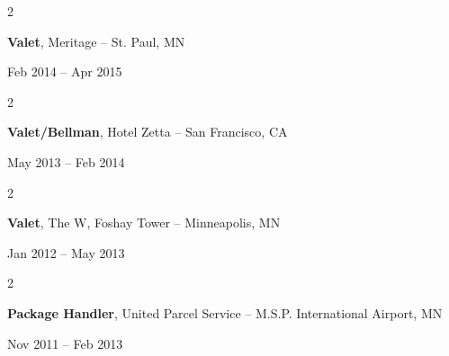 \documentclass[10pt, letterpaper]{article}
\newenvironment{twocolentry}[2][]{
    \onecolentry
    \def\secondColumn{#2}
    \setcolumnwidth{\fill, 4.5 cm}
    \begin{paracol}{2}
}{
    \switchcolumn \raggedleft \secondColumn
    \end{paracol}
    \endonecolentry
} %
\begin{document}
        \vspace{0.2 cm}
        
        
        \begin{samepage} 
            \begin{twocolentry}{
                Feb 2014 – Apr 2015
                }
                \textbf{Valet}, Meritage -- St. Paul, MN
            \end{twocolentry}
        \end{samepage}  


        \vspace{0.2 cm}


        \begin{samepage} 
            \begin{twocolentry}{
                May 2013 – Feb 2014
                }
                \textbf{Valet/Bellman}, Hotel Zetta -- San Francisco, CA
            \end{twocolentry}
        \end{samepage}  


        \vspace{0.2 cm}


        \begin{samepage} 
            \begin{twocolentry}{
                Jan 2012 – May 2013
                }
                \textbf{Valet}, The W, Foshay Tower -- Minneapolis, MN
            \end{twocolentry}
        \end{samepage}  


        \vspace{0.2 cm}


        \begin{samepage} 
            \begin{twocolentry}{
                Nov 2011 – Feb 2013
                }
                \textbf{Package Handler}, United Parcel Service -- M.S.P. International Airport, MN
            \end{twocolentry}
        \end{samepage}  
\end{document}
